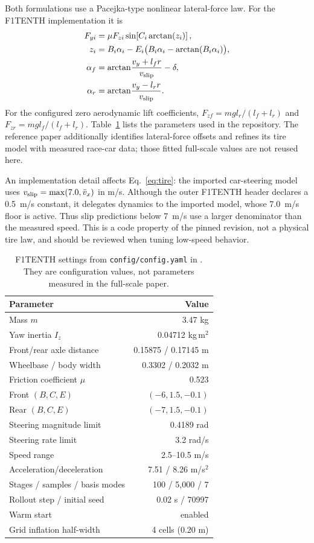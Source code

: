 Both formulations use a Pacejka-type nonlinear lateral-force law. For the F1TENTH implementation it is
\begin{equation}
\begin{aligned}
F_{yi}&=\mu F_{zi}\sin\!\left[C_i\arctan\!\left(z_i\right)\right],\\
z_i&=B_i\alpha_i-E_i\bigl(B_i\alpha_i-\arctan(B_i\alpha_i)\bigr),\\
\alpha_f&=\arctan\!\frac{v_y+l_fr}{v_{\rm slip}}-\delta,\\
\alpha_r&=\arctan\!\frac{v_y-l_rr}{v_{\rm slip}}.
\end{aligned}\label{eq:tire}
\end{equation}
For the configured zero aerodynamic lift coefficients, $F_{zf}=mg l_r/(l_f+l_r)$ and $F_{zr}=mg l_f/(l_f+l_r)$. Table~\ref{tab:configuration} lists the parameters used in the repository. The reference paper additionally identifies lateral-force offsets and refines its tire model with measured race-car data; those fitted full-scale values are not reused here.

An implementation detail affects Eq.~\ref{eq:tire}: the imported car-steering model uses $v_{\rm slip}=\max(7.0,\bar v_x)$ in m/s. Although the outer F1TENTH header declares a 0.5~m/s constant, it delegates dynamics to the imported model, whose 7.0~m/s floor is active. Thus slip predictions below 7~m/s use a larger denominator than the measured speed. This is a code property of the pinned revision, not a physical tire law, and should be reviewed when tuning low-speed behavior.

\begin{table}[htb]
\centering
\caption{F1TENTH settings from \texttt{config/config.yaml} in \cite{mulakaloori2026repo}. They are configuration values, not parameters measured in the full-scale paper.}
\label{tab:configuration}
\small
\begin{tabular}{lr}
\toprule
Parameter & Value\\
\midrule
Mass $m$ & 3.47 kg\\
Yaw inertia $I_z$ & 0.04712 kg\,m$^2$\\
Front/rear axle distance & 0.15875 / 0.17145 m\\
Wheelbase / body width & 0.3302 / 0.2032 m\\
Friction coefficient $\mu$ & 0.523\\
Front $(B,C,E)$ & $(-6,1.5,-0.1)$\\
Rear $(B,C,E)$ & $(-7,1.5,-0.1)$\\
Steering magnitude limit & 0.4189 rad\\
Steering rate limit & 3.2 rad/s\\
Speed range & 2.5--10.5 m/s\\
Acceleration/deceleration & 7.51 / 8.26 m/s$^2$\\
Stages / samples / basis modes & 100 / 5,000 / 7\\
Rollout step / initial seed & 0.02 s / 70997\\
Warm start & enabled\\
Grid inflation half-width & 4 cells (0.20 m)\\
\bottomrule
\end{tabular}
\end{table}

